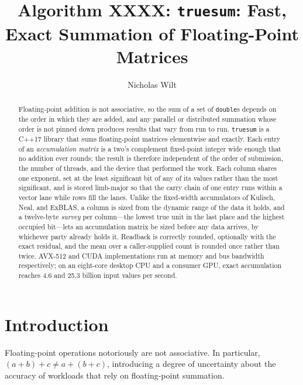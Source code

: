 \documentclass[acmsmall,screen,review]{acmart}
\newcommand{\code}[1]{\texttt{#1}}
\newcommand{\truesum}{\code{truesum}}
\begin{document}
\title{Algorithm XXXX: \truesum{}: Fast, Exact Summation of Floating-Point Matrices}

\author{Nicholas Wilt}

\begin{abstract}
Floating-point addition is not associative, so the sum of a set of \code{double}s depends on the order in which they are added, and any parallel or distributed summation whose order is not pinned down produces results that vary from run to run. \truesum{} is a C++17 library that sums floating-point matrices elementwise and exactly. Each entry of an \emph{accumulation matrix} is a two's complement fixed-point integer wide enough that no addition ever rounds; the result is therefore independent of the order of submission, the number of threads, and the device that performed the work. Each column shares one exponent, set at the least significant bit of any of its values rather than the most significant, and is stored limb-major so that the carry chain of one entry runs within a vector lane while rows fill the lanes. Unlike the fixed-width accumulators of Kulisch, Neal, and ExBLAS, a column is sized from the dynamic range of the data it holds, and a twelve-byte \emph{survey} per column---the lowest true unit in the last place and the highest occupied bit---lets an accumulation matrix be sized before any data arrives, by whichever party already holds it. Readback is correctly rounded, optionally with the exact residual, and the mean over a caller-supplied count is rounded once rather than twice. AVX-512 and CUDA implementations run at memory and bus bandwidth respectively; on an eight-core desktop CPU and a consumer GPU, exact accumulation reaches 4.6 and 25.3 billion input values per second.
\end{abstract}

\maketitle

\section{Introduction}

Floating-point operations notoriously are not associative. In particular, $(a+b)+c \ne a+(b+c)$, introducing a degree of uncertainty about the accuracy of workloads that rely on floating-point summation.
\end{document}
